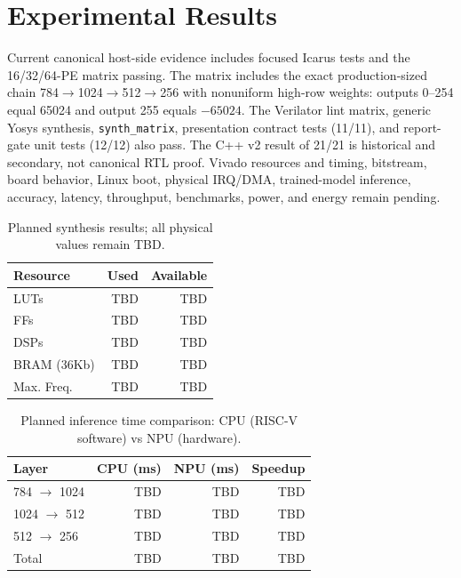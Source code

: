 \documentclass[10pt,conference]{IEEEtran}
\begin{document}
\section{Experimental Results}
\label{sec:results}


Current canonical host-side evidence includes focused Icarus tests and the 16/32/64-PE matrix passing. The matrix includes the exact production-sized chain 784$\to$1024$\to$512$\to$256 with nonuniform high-row weights: outputs 0--254 equal 65024 and output 255 equals $-65024$. The Verilator lint matrix, generic Yosys synthesis, \texttt{synth\_matrix}, presentation contract tests (11/11), and report-gate unit tests (12/12) also pass. The C++ v2 result of 21/21 is historical and secondary, not canonical RTL proof. Vivado resources and timing, bitstream, board behavior, Linux boot, physical IRQ/DMA, trained-model inference, accuracy, latency, throughput, benchmarks, power, and energy remain pending.

\begin{table}[htbp]
\centering
\caption{Planned synthesis results; all physical values remain TBD.}
\label{tab:synth}
\small
\begin{tabular}{lrr}
\toprule
\textbf{Resource} & \textbf{Used} & \textbf{Available} \\
\midrule
LUTs & TBD & TBD \\
FFs  & TBD & TBD \\
DSPs & TBD & TBD \\
BRAM (36Kb) & TBD & TBD \\
\midrule
Max. Freq. & TBD & TBD \\
\bottomrule
\end{tabular}
\end{table}

\begin{table}[htbp]
\centering
\caption{Planned inference time comparison: CPU (RISC-V software) vs NPU (hardware).}
\label{tab:bench}
\small
\begin{tabular}{lrrr}
\toprule
\textbf{Layer} & \textbf{CPU (ms)} & \textbf{NPU (ms)} & \textbf{Speedup} \\
\midrule
784 $\to$ 1024 & TBD & TBD & TBD \\
1024 $\to$ 512 & TBD & TBD & TBD \\
512 $\to$ 256  & TBD & TBD & TBD \\
\midrule
Total & TBD & TBD & TBD \\
\bottomrule
\end{tabular}
\end{table}
\end{document}
